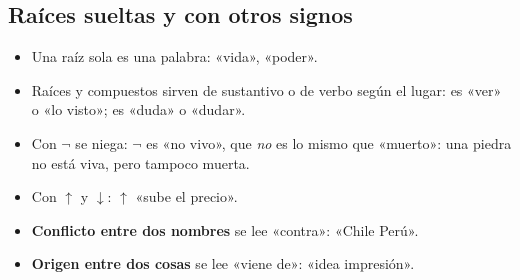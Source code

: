 \subsection{Raíces sueltas y con otros signos}
\begin{itemize}
\item Una raíz sola es una palabra:  «vida»,  «poder».
\item Raíces y compuestos sirven de sustantivo o de verbo según el lugar:
  es «ver» o «lo visto»;  es «duda» o «dudar».
\item Con \(\neg\) se niega: \(\neg\) es «no vivo», que \emph{no} es lo
 mismo que  «muerto»: una piedra no está viva, pero tampoco muerta.
\item Con \(\uparrow\) y \(\downarrow\): \(\uparrow\) «sube el precio».
\item \textbf{Conflicto entre dos nombres} se lee «contra»: «Chile  Perú».
\item \textbf{Origen entre dos cosas} se lee «viene de»: «idea  impresión».
\end{itemize}

\clearpage
